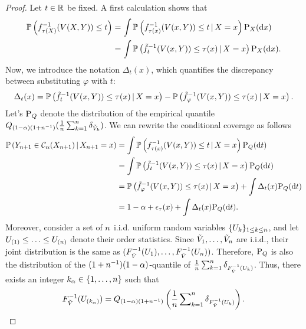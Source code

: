 \begin{proof}
  Let $t\in\mathbb{R}$ be fixed. A first calculation shows that
  \begin{align*}
    \mathbb{P}\left({f_{\tau(X)}^{-1}(V(X,Y))\le t}\right)
    &= \int \mathbb{P}\left({f_{\tau(x)}^{-1}(V(x,Y))\le t \,\vert\, X=x}\right) \textup{P}_{X}(\mathrm{d} x)
    \\
    &= \int \mathbb{P}\left({\tilde{f}_{t}^{-1}(V(x,Y))\le \tau(x) \,\vert\, X=x}\right) \textup{P}_{X}(\mathrm{d} x).
  \end{align*}
  Now, we introduce the notation $\Delta_{t}(x)$, which quantifies the discrepancy between substituting $\varphi$ with $t$:
  \begin{equation*}
    \Delta_{t}(x)
    = \mathbb{P}\left({\tilde{f}_{t}^{-1}(V(x,Y))\le \tau(x) \,\vert\, X=x}\right)
    - \mathbb{P}\left({\tilde{f}_{\varphi}^{-1}(V(x,Y))\le \tau(x) \,\vert\, X=x}\right).
  \end{equation*}
  Let's $\textup{P}_Q$ denote the distribution of the empirical quantile $Q_{(1-\alpha)(1+n^{-1})} (\frac{1}{n} \sum\nolimits_{k=1}^{n} \delta_{\tilde{V}_k})$.
  We can rewrite the conditional coverage as follows
  \begin{align*}
    \mathbb{P}\left({Y_{n+1}\in \mathcal{C}_{\alpha}(X_{n+1}) \,\vert\, X_{n+1}=x}\right)
    &= \int \mathbb{P}\left({f_{\tau(x)}^{-1}(V(x,Y))\le t \,\vert\, X=x}\right) \textup{P}_Q(\mathrm{d} t)
    \\
    &= \int \mathbb{P}\left({\tilde{f}_{t}^{-1}(V(x,Y))\le \tau(x) \,\vert\, X=x}\right) \textup{P}_Q(\mathrm{d} t)
    \\
    &= \mathbb{P}\left({\tilde{f}_{\varphi}^{-1}(V(x,Y))\le \tau(x) \,\vert\, X=x}\right) + \int \Delta_{t}(x) \textup{P}_Q(\mathrm{d} t)
    \\
    &= 1 - \alpha + \epsilon_{\tau}(x) + \int \Delta_{t}(x) \textup{P}_Q(\mathrm{d} t).
  \end{align*}
  Moreover, consider a set of $n$ i.i.d. uniform random variables $\{U_k\}_{1\le k\le n}$, and let $U_{(1)}\le\ldots\le U_{(n)}$ denote their order statistics.
  Since $\tilde{V}_1,\ldots,\tilde{V}_{n}$ are i.i.d., their joint distribution is the same as $(F_{\tilde{V}}^{-1}(U_1),\ldots,F_{\tilde{V}}^{-1}(U_{n}))$.
  Therefore, $\textup{P}_{Q}$ is also the distribution of the $(1+n^{-1})(1-\alpha)$-quantile of $\frac{1}{n} \sum\nolimits_{k=1}^{n} \delta_{F_{\tilde{V}}^{-1}(U_k)}$. Thus, there exists an integer $k_{\alpha}\in\{1,\ldots,n\}$ such that
  \begin{equation*}
    F_{\tilde{V}}^{-1}(U_{(k_{\alpha})}) = \q{(1-\alpha)(1+\tcount^{-1})} \pr{ \frac{1}{\tcount} \sum\nolimits_{k=1}^{\tcount} \delta_{F_{\tilde{V}}^{-1}(U_k)} }.

\end{equation*}
\end{proof}
